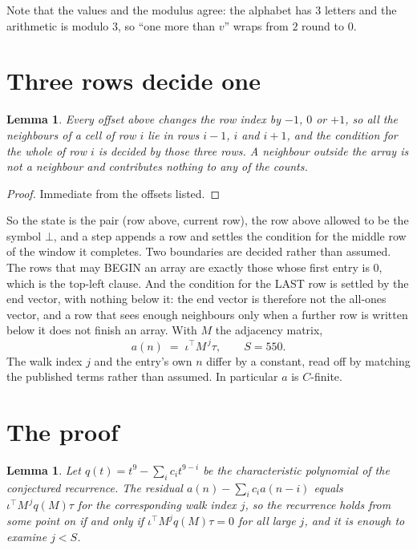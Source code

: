 \documentclass[11pt,a4paper]{article}
\theoremstyle{plain}
\newtheorem{lemma}[theorem]{Lemma}
\theoremstyle{definition}
\begin{document}
Note that the values and the modulus agree: the alphabet has $3$ letters and the arithmetic
is modulo $3$, so ``one more than $v$'' wraps from $2$ round to $0$.

\section{Three rows decide one}

\begin{lemma}\label{lem:win}
Every offset above changes the row index by $-1$, $0$ or $+1$, so all the neighbours of a cell
of row $i$ lie in rows $i-1$, $i$ and $i+1$, and the condition for the whole of row $i$ is
decided by those three rows. A neighbour outside the array is not a neighbour and contributes
nothing to any of the counts.
\end{lemma}

\begin{proof}
Immediate from the offsets listed.
\end{proof}

So the state is the pair (row above, current row), the row above allowed to be the symbol
$\bot$, and a step appends a row and settles the condition for the middle row of the window it
completes. Two boundaries are decided rather than assumed. The rows that may BEGIN an array are
exactly those whose first entry is $0$, which is the top-left clause. And the condition for the
LAST row is settled by the end vector, with nothing below it: the end vector is therefore not
the all-ones vector, and a row that sees enough neighbours only when a further row is written
below it does not finish an array. With $M$ the adjacency matrix,
\[
a(n)\;=\;\iota^{\!\top}M^{\,j}\tau ,\qquad S=550.
\]
The walk index $j$ and the entry's own $n$ differ by a constant, read off by matching the
published terms rather than assumed. In particular $a$ is $C$-finite.

\section{The proof}

\begin{lemma}\label{lem:crit}
Let $q(t)=t^{9}-\sum_i c_it^{9-i}$ be the characteristic polynomial of the
conjectured recurrence. The residual $a(n)-\sum_ic_ia(n-i)$ equals
$\iota^{\!\top}M^{\,j}q(M)\tau$ for the corresponding walk index $j$, so the recurrence
holds from some point on if and only if $\iota^{\!\top}M^{j}q(M)\tau=0$ for all large $j$,
and it is enough to examine $j<S$.
\end{lemma}
\end{document}
